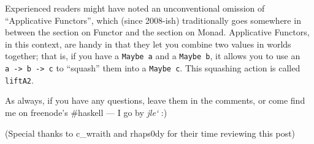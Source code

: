 \documentclass[]{article}
\begin{document}
Experienced readers might have noted an unconventional omission of
``Applicative Functors'', which (since 2008-ish) traditionally goes
somewhere in between the section on Functor and the section on Monad.
Applicative Functors, in this context, are handy in that they let you
combine two values in worlds together; that is, if you have a
\texttt{Maybe\ a} and a \texttt{Maybe\ b}, it allows you to use an
\texttt{a\ -\textgreater{}\ b\ -\textgreater{}\ c} to ``squash'' them
into a \texttt{Maybe\ c}. This squashing action is called
\texttt{liftA2}.

As always, if you have any questions, leave them in the comments, or
come find me on freenode's \#haskell --- I go by \emph{jle`} :)

(Special thanks to c\_wraith and rhaps0dy for their time reviewing this
post)
\end{document}
